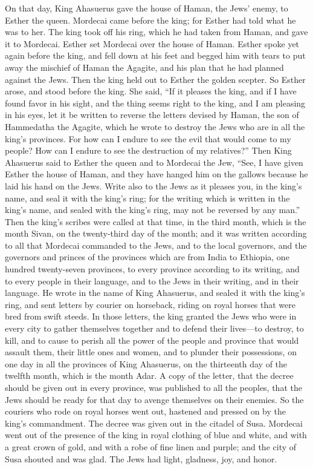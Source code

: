  On that day, King Ahasuerus gave the house of Haman, the
Jews' enemy, to Esther the queen. Mordecai came before the king; for
Esther had told what he was to her.  The king took off his
ring, which he had taken from Haman, and gave it to Mordecai. Esther set
Mordecai over the house of Haman.  Esther spoke yet again
before the king, and fell down at his feet and begged him with tears to
put away the mischief of Haman the Agagite, and his plan that he had
planned against the Jews.  Then the king held out to
Esther the golden scepter. So Esther arose, and stood before the king.
 She said, ``If it pleases the king, and if I have found
favor in his sight, and the thing seems right to the king, and I am
pleasing in his eyes, let it be written to reverse the letters devised
by Haman, the son of Hammedatha the Agagite, which he wrote to destroy
the Jews who are in all the king's provinces.  For how can
I endure to see the evil that would come to my people? How can I endure
to see the destruction of my relatives?''  Then King
Ahasuerus said to Esther the queen and to Mordecai the Jew, ``See, I
have given Esther the house of Haman, and they have hanged him on the
gallows because he laid his hand on the Jews.  Write also
to the Jews as it pleases you, in the king's name, and seal it with the
king's ring; for the writing which is written in the king's name, and
sealed with the king's ring, may not be reversed by any man.''
 Then the king's scribes were called at that time, in the
third month, which is the month Sivan, on the twenty-third day of the
month; and it was written according to all that Mordecai commanded to
the Jews, and to the local governors, and the governors and princes of
the provinces which are from India to Ethiopia, one hundred twenty-seven
provinces, to every province according to its writing, and to every
people in their language, and to the Jews in their writing, and in their
language.  He wrote in the name of King Ahasuerus, and
sealed it with the king's ring, and sent letters by courier on
horseback, riding on royal horses that were bred from swift steeds.
 In those letters, the king granted the Jews who were in
every city to gather themselves together and to defend their lives---to
destroy, to kill, and to cause to perish all the power of the people and
province that would assault them, their little ones and women, and to
plunder their possessions,  on one day in all the
provinces of King Ahasuerus, on the thirteenth day of the twelfth month,
which is the month Adar.  A copy of the letter, that the
decree should be given out in every province, was published to all the
peoples, that the Jews should be ready for that day to avenge themselves
on their enemies.  So the couriers who rode on royal
horses went out, hastened and pressed on by the king's commandment. The
decree was given out in the citadel of Susa.  Mordecai
went out of the presence of the king in royal clothing of blue and
white, and with a great crown of gold, and with a robe of fine linen and
purple; and the city of Susa shouted and was glad.  The
Jews had light, gladness, joy, and honor.

